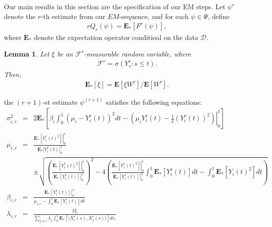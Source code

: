 \documentclass[12pt]{article}%
\newtheorem{lem}{Lemma}
\begin{document}
Our main results in this section are the specification of our EM steps.  Let $\psi^r$ denote the $r$-th estimate from our $EM$-sequence, and for each $\psi \in \Psi$, define  
\begin{eqnarray}
rQ_r(\psi) = \mathbf E_*[F^r(\psi)],
\end{eqnarray}
where $\mathbf E_*$ denote the expectation operator conditioal on the data $\mathcal D$.  
\begin{lem}
Let $\xi$ be an $\mathcal F^r$-measurable random variable, where
\begin{eqnarray}
\mathcal F^r = \sigma(Y_s^r: s \le t).
\end{eqnarray}  
Then, 
\begin{eqnarray}
\mathbf E_*[\xi] = \mathbf E[\xi W^r]/\mathbf E[W^r].
\end{eqnarray}
\end{lem}


the $(r+1)$-st estimate $\psi^{(r+1)}$ satisfies the following equations:
\begin{eqnarray*}
\sigma_{i,r}^2 &=& 2 \mathbf E_*\left[ \beta_i \int_0^1 \left(\mu_i - Y_i^r(t)\right)^2dt 
- \left(\left.\mu_i Y_i^r(t) - \frac{1}{2} (Y_i^r(t))^2\right)\right|_0^1\right]\\\mu_{i,r} 
&=&  \frac{\left. \mathbf E_*[Y_i^r(t)^2]\right|_0^1}{\left.\mathbf E_*[Y_i^r(t)\right|_0^1}\\ 
&\ &\pm
\sqrt{
\left(\frac{\left.\mathbf E_*[Y_i^r(t)^2]\right|_0^1}{\left.\mathbf E_*[Y_i^r(t)]\right|_0^1}\right)^2 
-
4\left( \frac{\left.\mathbf E_*[Y_i^r(t)^2]\right|_0^1}{\left.\mathbf E_*[Y_i^r(t)]\right|_0^1} \int_0^1\mathbf E_*[Y_i^r(t)]dt - \int_0^1 \mathbf E_*[Y_i(t)^2] dt\right)}\\
\beta_{i,r}
&=&
\frac{\left. \mathbf E_*[Y_i^r(t)] \right|_0^1}{\mu_{i,r} - \int_0^1 \mathbf E_*[Y_i^r(t)]dt}\\
\lambda_{i,r} 
&=& 
\frac{M_i}
{
\sum_{j\neq i} \lambda_j \int_0^1 \mathbf E_*[\langle X_i^r(s), X_j^r(s)\rangle] ds.
} 
\end{eqnarray*}
\end{document}
